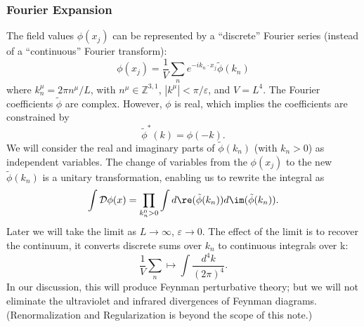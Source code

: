 \subsubsection{Fourier Expansion} The field values $\phi(x_j)$
can be represented by a ``discrete'' Fourier series (instead of a
``continuous'' Fourier transform):
\begin{equation}\label{eq:fourierSeriesField}
\phi(x_j) = \frac{1}{V}\sum_{n}e^{-ik_{n}\cdot{x_{j}}}\tilde{\phi}(k_n)
\end{equation}
where $k^{\mu}_{n}=2\pi{n^{\mu}}/L$, with
$n^{\mu}\in\mathbb{Z}^{3,1}$, $|k^{\mu}|<\pi/\varepsilon$, and
$V=L^{4}$. The Fourier coefficients $\tilde{\phi}$ are
complex. However, $\phi$ is real, which implies the coefficients
are constrained by
\begin{equation}%
\tilde{\phi}^{*}(k) = \phi(-k).
\end{equation}
We will consider the real and imaginary parts of $\tilde{\phi}(k_{n})$
(with $k_n>0$) as independent variables. The change of variables
from the $\phi(x_j)$ to the new $\tilde{\phi}(k_n)$ is a unitary
transformation, enabling us to rewrite the integral as
\begin{equation}%
\int\mathcal{D}\phi(x) = \prod_{k^{0}_{n}>0}\int
d\re(\tilde{\phi}(k_{n}))
d\im(\tilde{\phi}(k_{n})).
\end{equation}
Later we will take the limit as $L\to\infty$,
$\varepsilon\to0$. The effect of the limit is to recover the
continuum, it converts discrete sums over $k_n$ to continuous
integrals over k:
\begin{equation}%
\frac{1}{V}\sum_{n}\longmapsto\int\frac{d^{4}k}{(2\pi)^4}.
\end{equation}
In our discussion, this will produce Feynman perturbative theory;
but we will not eliminate the ultraviolet and infrared
divergences of Feynman diagrams. (Renormalization and
Regularization is beyond the scope of this note.)

